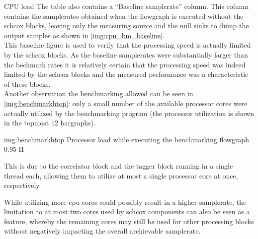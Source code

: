 \begin{subchapter}{CPU load}
  The table also contains a ``Baseline samplerate'' column.
  This column contains the samplerates obtained when the flowgraph
  is executed without the \gls{schcox} blocks, leaving only
  the measuring source and the null sinks to dump the
  output samples as shown in \autoref{img:cpu_bm_baseline}. \\

  This baseline figure is used to verify that the
  processing speed is actually limited by the \gls{schcox} blocks.
  As the baseline samplerates were substantially larger
  than the bechmark rates it is relatively certain that
  the processing speed was indeed limited by the \gls{schcox} blocks
  and the measured performance was a characteristic of these blocks. \\

  Another observation the benchmarking allowed can be seen
  in \autoref{img:benchmarkhtop}: only a small number of the available
  processor cores were actually utilized by the benchmarking program
  (the processor utilization is shown in the topmost 12 bargraphs).

                  {img:benchmarkhtop}
                  {Processor load while executing the benchmarking flowgraph}
                  {0.95}
                  {H}

  This is due to the correlator block and the tagger block running
  in a single thread each, allowing them to utilize at most
  a single processor core at once, respectively.

  While utilizing more \gls{cpu} cores could possibly
  result in a higher samplerate, the limitation to at most
  two cores used by \gls{schcox} components can
  also be seen as a feature, whereby the remaining cores
  may still be used for other processing blocks without
  negatively impacting the overall archievable samplerate.
\end{subchapter}
